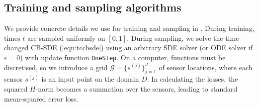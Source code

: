 \subsection{Training and sampling algorithms}
We provide concrete details we use for training and sampling in . During training, times \(t\) are sampled uniformly on \([0, 1]\). During sampling, we solve the time-changed CB-SDE (\ref{eqn:tccbsde}) using an arbitrary SDE solver (or ODE solver if \(\varepsilon = 0\)) with update function \texttt{OneStep}. On a computer, functions must be discretised, so we introduce a grid \(\mathcal{G} = \{s^{(j)}\}_{j=1}^{J}\) of sensor locations, where each sensor \(s^{(j)}\) is an input point on the domain \(D\). In calculating the losses, the squared \(H\)-norm becomes a summation over the sensors, leading to standard mean-squared error loss.


